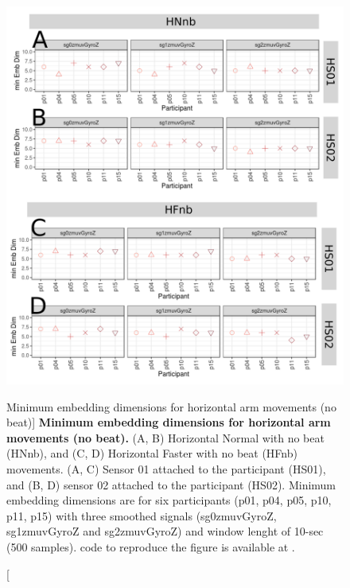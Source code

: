 \begin{figure}
\centering
\includegraphics[width=1.0\textwidth]{cao_Hnb_w10}
	\caption
	[Minimum embedding dimensions for horizontal arm movements 
	(no beat)]{
	{\bf Minimum embedding dimensions for horizontal arm movements 
	(no beat).} 
		(A, B) Horizontal Normal with no beat (HNnb), and 
		(C, D) Horizontal Faster with no beat (HFnb) movements.
		(A, C) Sensor 01 attached to the participant (HS01), and
		(B, D) sensor 02 attached to the participant (HS02).
		Minimum embedding dimensions are for six participants 
		(p01, p04, p05, p10, p11, p15) with three smoothed signals 
		(sg0zmuvGyroZ, sg1zmuvGyroZ and sg2zmuvGyroZ)
		and window lenght of 10-sec (500 samples).
		\R code to reproduce the figure is available at 
		.
        }
    \label{fig:a:caoHnb}
\end{figure}
